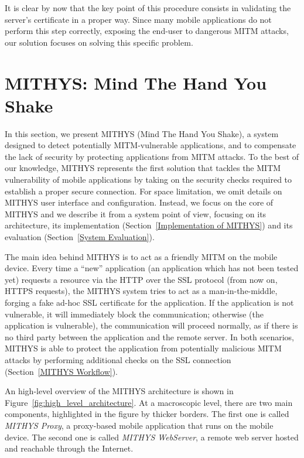 \documentclass[english]{llncs}
\begin{document}
It is clear by now that the key point of this procedure consists in validating the server's certificate in a proper way. Since many mobile applications do not perform this step correctly, exposing the end-user to dangerous MITM attacks, our solution focuses on solving this specific problem.

\section{MITHYS: Mind The Hand You Shake}
\label{MITHYS Architecture}

In this section, we present MITHYS (Mind The Hand You Shake), a system designed to detect potentially MITM-vulnerable applications, and to compensate the lack of security by protecting applications from MITM attacks. To the best of our knowledge, MITHYS represents the first solution that tackles the MITM vulnerability of mobile applications by taking on the security checks required to establish a proper secure connection. For space limitation, we omit details on MITHYS user interface and configuration. Instead,  we focus on the core of MITHYS and we describe it from a system point of view, focusing on its architecture, its implementation (Section~\ref{Implementation of MITHYS}) and its evaluation (Section~\ref{System Evaluation}).

The main idea behind MITHYS is to act as a friendly MITM on the mobile device. Every time a ``new'' application (an application which has not been tested yet) requests a resource via the HTTP over the SSL protocol (from now on, HTTPS requests), the MITHYS system tries to act as a man-in-the-middle, forging a fake ad-hoc SSL certificate for the application. If the application is not vulnerable, it will immediately block the communication; otherwise (the application is vulnerable), the communication will proceed normally, as if there is no third party between the application and the remote server. In both scenarios, MITHYS is able to protect the application from potentially malicious MITM attacks by performing additional checks on the SSL connection (Section~\ref{MITHYS Workflow}).

An high-level overview of the MITHYS architecture is shown in Figure~\ref{fig:high_level_architecture}. At a macroscopic level, there are two main components, highlighted in the figure by thicker borders. The first one is called \textit{MITHYS Proxy}, a proxy-based mobile application that runs on the mobile device. The second one is called \textit{MITHYS WebServer}, a remote web server hosted and reachable through the Internet. 
\end{document}
